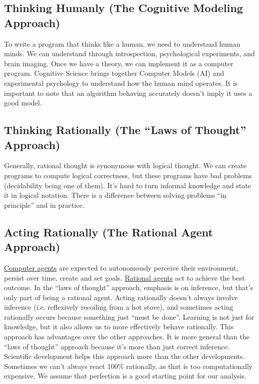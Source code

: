 
\subsection{Thinking Humanly (The Cognitive Modeling Approach)} %
\label{sub:thinking_humanly}

To write a program that thinks like a human, we need to understand human minds.
We can understand through introspection, psychological experiments, and brain
imaging.
Once we have a theory, we can implement it as a computer program.
Cognitive Science brings together Computer Models (AI) and experimental
psychology to understand how the human mind operates.
It is important to note that an algorithm behaving accurately doesn't imply it
uses a good model.


\subsection{Thinking Rationally (The ``Laws of Thought'' Approach)} %
\label{sub:thinking_rationally}

Generally, rational thought is synonymous with logical thought.
We can create programs to compute logical correctness, but these programs have
bad problems (decidability being one of them).
It's hard to turn informal knowledge and state it in logical notation.
There is a difference between solving problems ``in principle'' and in practice.


\subsection{Acting Rationally (The Rational Agent Approach)} %
\label{sub:acting_rationally}

\uline{Computer agents} are expected to autonomously perceive their environment,
persist over time, create and set goals.
\uline{Rational agents} act to achieve the best outcome.
In the ``laws of thought'' approach, emphasis is on inference, but that's only
part of being a rational agent.
Acting rationally doesn't always involve inference (i.e. reflexively recoiling
from a hot stove), and sometimes acting rationally occurs because something just
``must be done''. %
Learning is not just for knowledge, but it also allows us to more effectively
behave rationally.
This approach has advantages over the other approaches.
It is more general than the ``laws of thought'' approach because it's more than
just correct inference.
Scientific development helps this approach more than the other developments.
Sometimes we can't always react 100\% rationally, as that is too computationally
expensive.
We assume that perfection is a good starting point for our analysis.


